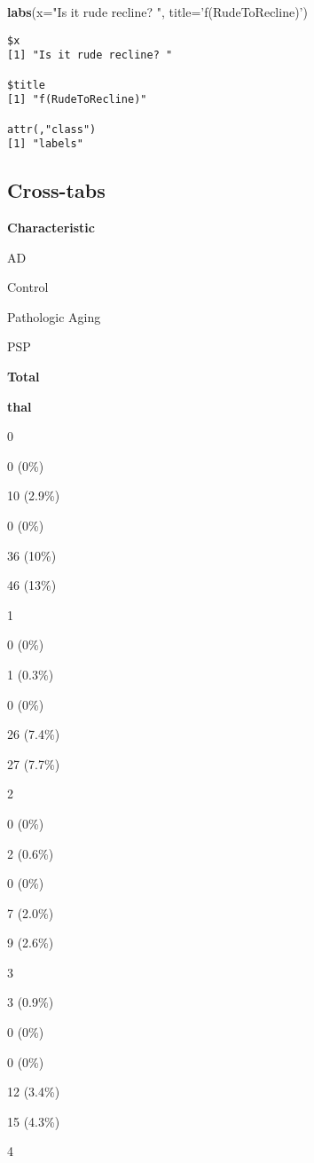 \documentclass[]{book}
\newenvironment{Shaded}{\begin{snugshade}}{\end{snugshade}}
\newcommand{\DataTypeTok}[1]{\textcolor[rgb]{0.13,0.29,0.53}{#1}}
\newcommand{\KeywordTok}[1]{\textcolor[rgb]{0.13,0.29,0.53}{\textbf{#1}}}
\newcommand{\NormalTok}[1]{#1}
\newcommand{\StringTok}[1]{\textcolor[rgb]{0.31,0.60,0.02}{#1}}
\begin{document}
\begin{Shaded}
\begin{Highlighting}[]
   \KeywordTok{labs}\NormalTok{(}\DataTypeTok{x=}\StringTok{"Is it rude recline? "}\NormalTok{, }\DataTypeTok{title=}\StringTok{'f(RudeToRecline)'}\NormalTok{) }
\end{Highlighting}
\end{Shaded}

\begin{verbatim}
$x
[1] "Is it rude recline? "

$title
[1] "f(RudeToRecline)"

attr(,"class")
[1] "labels"
\end{verbatim}

\hypertarget{cross-tabs}{%
\subsection{Cross-tabs}\label{cross-tabs}}

\textbf{Characteristic}

AD

Control

Pathologic Aging

PSP

\textbf{Total}

\textbf{thal}

0

0 (0\%)

10 (2.9\%)

0 (0\%)

36 (10\%)

46 (13\%)

1

0 (0\%)

1 (0.3\%)

0 (0\%)

26 (7.4\%)

27 (7.7\%)

2

0 (0\%)

2 (0.6\%)

0 (0\%)

7 (2.0\%)

9 (2.6\%)

3

3 (0.9\%)

0 (0\%)

0 (0\%)

12 (3.4\%)

15 (4.3\%)

4
\end{document}
